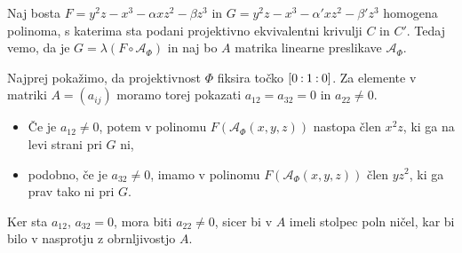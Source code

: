 \documentclass[mat1]{fmfdelo}
\numberwithin{equation}{section}
\newcommand{\linphi}{\mathcal{A}_\Phi}
\newcommand{\oio}{\pcoor{0: 1 : 0}}
\newcommand{\pcoor}[1]{%
\begingroup\lccode`~=`: \lowercase{\endgroup
\edef~}{\mathbin{\mathchar\the\mathcode`:}\nobreak}%
\left[%
\begingroup
\mathcode`:=\string"8000
#1%
\endgroup
\right]%
}
\theoremstyle{definition}
\begin{document}
\begin{dokaz}
    Naj bosta $F = y^2z - x^3 - \alpha xz^2 - \beta z^3$ in $G = y^2z - x^3 - \alpha' xz^2 - \beta' z^3$ homogena polinoma, s katerima sta podani projektivno ekvivalentni krivulji $C$ in $C'$. Tedaj vemo, da je $G = \lambda(F \circ \linphi)$ in naj bo $A$ matrika linearne preslikave $\linphi$.
    
    Najprej pokažimo, da projektivnost $\Phi$ fiksira točko $\oio$. Za elemente v matriki $A = (a_{ij})$ moramo torej pokazati $a_{12} = a_{32} = 0$ in $a_{22} \neq 0$. 
    \begin{itemize}
        \item Če je $a_{12} \neq 0$, potem v polinomu $F(\linphi(x,y,z))$ nastopa člen $x^2z$, ki ga na levi strani pri $G$ ni, 
        \item podobno, če je $a_{32} \neq 0$, imamo v polinomu $F(\linphi(x,y,z))$ člen $yz^2$, ki ga prav tako ni pri $G$. 
    \end{itemize}
    Ker sta $a_{12}$, $a_{32} = 0$, mora biti $a_{22} \neq 0$, sicer bi v $A$ imeli stolpec poln ničel, kar bi bilo v nasprotju z obrnljivostjo $A$. 
    

\end{dokaz}
\end{document}
